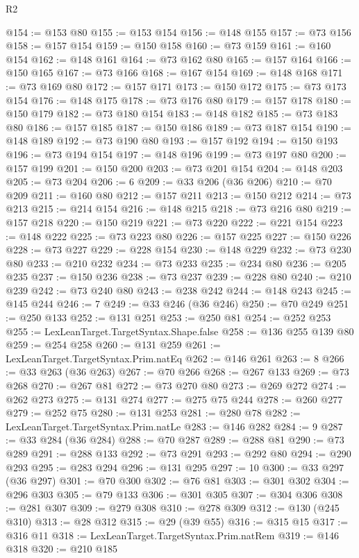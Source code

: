 \begin{lexlean}{R2}
\begin{coremodule}
@154 := @153 @80
@155 := @153 @154
@156 := @148 @155
@157 := @73 @156
@158 := @157 @154
@159 := @150 @158
@160 := @73 @159
@161 := @160 @154
@162 := @148 @161
@164 := @73 @162 @80
@165 := @157 @164
@166 := @150 @165
@167 := @73 @166
@168 := @167 @154
@169 := @148 @168
@171 := @73 @169 @80
@172 := @157 @171
@173 := @150 @172
@175 := @73 @173 @154
@176 := @148 @175
@178 := @73 @176 @80
@179 := @157 @178
@180 := @150 @179
@182 := @73 @180 @154
@183 := @148 @182
@185 := @73 @183 @80
@186 := @157 @185
@187 := @150 @186
@189 := @73 @187 @154
@190 := @148 @189
@192 := @73 @190 @80
@193 := @157 @192
@194 := @150 @193
@196 := @73 @194 @154
@197 := @148 @196
@199 := @73 @197 @80
@200 := @157 @199
@201 := @150 @200
@203 := @73 @201 @154
@204 := @148 @203
@205 := @73 @204
@206 := 6
@209 := @33 @206 (@36 @206)
@210 := @70 @209
@211 := @160 @80
@212 := @157 @211
@213 := @150 @212
@214 := @73 @213
@215 := @214 @154
@216 := @148 @215
@218 := @73 @216 @80
@219 := @157 @218
@220 := @150 @219
@221 := @73 @220
@222 := @221 @154
@223 := @148 @222
@225 := @73 @223 @80
@226 := @157 @225
@227 := @150 @226
@228 := @73 @227
@229 := @228 @154
@230 := @148 @229
@232 := @73 @230 @80
@233 := @210 @232
@234 := @73 @233
@235 := @234 @80
@236 := @205 @235
@237 := @150 @236
@238 := @73 @237
@239 := @228 @80
@240 := @210 @239
@242 := @73 @240 @80
@243 := @238 @242
@244 := @148 @243
@245 := @145 @244
@246 := 7
@249 := @33 @246 (@36 @246)
@250 := @70 @249
@251 := @250 @133
@252 := @131 @251
@253 := @250 @81
@254 := @252 @253
@255 := LexLeanTarget.TargetSyntax.Shape.false
@258 := @136 @255 @139 @80
@259 := @254 @258
@260 := @131 @259
@261 := LexLeanTarget.TargetSyntax.Prim.natEq
@262 := @146 @261
@263 := 8
@266 := @33 @263 (@36 @263)
@267 := @70 @266
@268 := @267 @133
@269 := @73 @268
@270 := @267 @81
@272 := @73 @270 @80
@273 := @269 @272
@274 := @262 @273
@275 := @131 @274
@277 := @275 @75 @244
@278 := @260 @277
@279 := @252 @75
@280 := @131 @253
@281 := @280 @78
@282 := LexLeanTarget.TargetSyntax.Prim.natLe
@283 := @146 @282
@284 := 9
@287 := @33 @284 (@36 @284)
@288 := @70 @287
@289 := @288 @81
@290 := @73 @289
@291 := @288 @133
@292 := @73 @291
@293 := @292 @80
@294 := @290 @293
@295 := @283 @294
@296 := @131 @295
@297 := 10
@300 := @33 @297 (@36 @297)
@301 := @70 @300
@302 := @76 @81
@303 := @301 @302
@304 := @296 @303
@305 := @79 @133
@306 := @301 @305
@307 := @304 @306
@308 := @281 @307
@309 := @279 @308
@310 := @278 @309
@312 := @130 (@245 @310)
@313 := @28 @312
@315 := @29 (@39 @55)
@316 := @315 @15
@317 := @316 @11
@318 := LexLeanTarget.TargetSyntax.Prim.natRem
@319 := @146 @318
@320 := @210 @185

\end{coremodule}
\end{lexlean}
